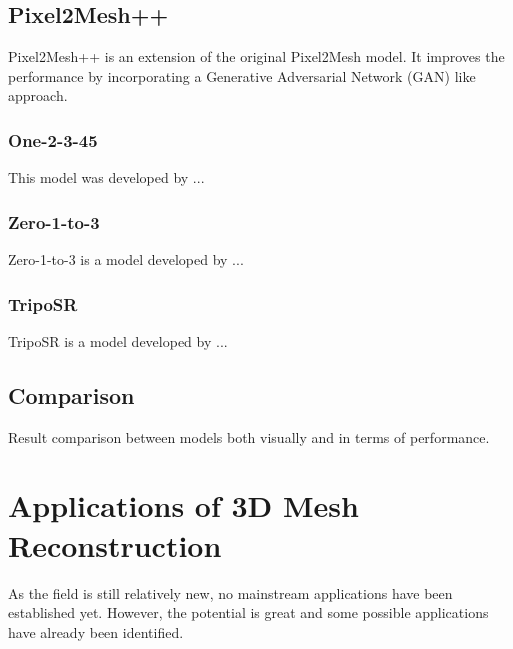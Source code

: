\subsection{Pixel2Mesh++}
Pixel2Mesh++ \autocite{wen_pixel2mesh_2019} is an extension of the original Pixel2Mesh model. It improves the performance by incorporating a Generative Adversarial Network (GAN) like approach.

\subsubsection{One-2-3-45}
This model was developed by \textcite{liu_one-2-3-45_2023-1}...

\subsubsection{Zero-1-to-3}
Zero-1-to-3 is a model developed by \textcite{liu_zero-1--3_2023}...
\subsubsection{TripoSR}
TripoSR is a model developed by \textcite{tochilkin_triposr_2024}...

\subsection{Comparison}
Result comparison between models both visually and in terms of performance.

\section{Applications of 3D Mesh Reconstruction}
As the field is still relatively new, no mainstream applications have been established yet. However, the potential is great and some possible applications have already been identified.

